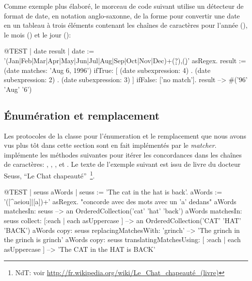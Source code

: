 \documentclass[a4paper,10pt,twoside]{book}
\begin{document}
Comme exemple plus élaboré, le morceau de code suivant utilise un
détecteur de format de date,
en notation anglo-saxonne,
de la forme \mbox{}  pour convertir une date en un tableau à
trois éléments contenant les chaînes de caractères pour l'année
(), le mois () et le jour ():

\begin{code}{@TEST | date result |}
date := '(Jan|Feb|Mar|Apr|May|Jun|Jul|Aug|Sep|Oct|Nov|Dec)\s+(\d\d?)\s*,(\d\d)' asRegex.
result := (date matches: 'Aug 6, 1996')
       ifTrue: [{ (date subexpression: 4) .
				(date subexpression: 2) .
				(date subexpression: 3) } ]
        ifFalse: ['no match'].
result --> #('96' 'Aug' '6')
\end{code}

\subsection{Énumération et remplacement}

Les protocoles de la classe  pour l'énumeration
 et le remplacement que nous avons vus plus tôt
dans cette section sont en fait implémentés par le \emph{matcher}. 
 implémente les méthodes suivantes pour itérer les
concordances dans les chaînes de caractères:
,
\mbox{,}
,
 et
\mbox{.}
Le texte de l'exemple suivant est issu de livre du docteur Seuss, ``Le Chat chapeauté''~\footnote{NdT: voir \url{http://fr.wikipedia.org/wiki/Le_Chat_chapeauté_(livre)}}.

\begin{code}{@TEST | seuss aWords |}
seuss := 'The cat in the hat is back'.
aWords := '\<([^aeiou]|[a])+\>' asRegex.    "concorde avec des mots avec un 'a' dedans"
aWords matchesIn: seuss
    --> an OrderedCollection('cat' 'hat' 'back')
aWords matchesIn: seuss collect: [:each | each asUppercase ]
    --> an OrderedCollection('CAT' 'HAT' 'BACK')
aWords copy: seuss replacingMatchesWith: 'grinch'
    --> 'The grinch in the grinch is grinch'
aWords copy: seuss translatingMatchesUsing: [ :each | each asUppercase ]
    --> 'The CAT in the HAT is BACK'
\end{code} %
\end{document}
